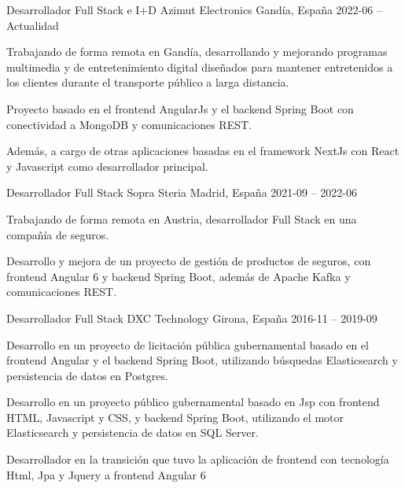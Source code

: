 \documentclass[]{awesome-cv}
\begin{document}
\begin{cventries}
	\cventry
	{Desarrollador Full Stack e I+D}
	{Azimut Electronics}
	{Gandía, España}
	{2022-06 – Actualidad}
	{\begin{cvitems}
		\vspace{0.5mm}
		\item {Trabajando de forma remota en Gandía, desarrollando y mejorando programas multimedia y de entretenimiento digital diseñados para mantener entretenidos a los clientes durante el transporte público a larga distancia.}
		\item {Proyecto basado en el frontend AngularJs y el backend Spring Boot con conectividad a MongoDB y comunicaciones REST.}
        \item {Además, a cargo de otras aplicaciones basadas en el framework NextJs con React y Javascript como desarrollador principal.}
		\end{cvitems}}

	\cventry
	{Desarrollador Full Stack}
	{Sopra Steria}
	{Madrid, España}
	{2021-09 – 2022-06}
	{\begin{cvitems}
		\vspace{0.5mm}
		\item {Trabajando de forma remota en Austria, desarrollador Full Stack en una compañía de seguros.}
		\item {Desarrollo y mejora de un proyecto de gestión de productos de seguros, con frontend Angular 6 y backend Spring Boot, además de Apache Kafka y comunicaciones REST.}
		\end{cvitems}}

	\cventry
	{Desarrollador Full Stack}
	{DXC Technology}
	{Girona, España}
	{2016-11 – 2019-09}
	{\begin{cvitems}
		\vspace{0.5mm}
		\item {Desarrollo en un proyecto de licitación pública gubernamental basado en el frontend Angular y el backend Spring Boot, utilizando búsquedas Elasticsearch y persistencia de datos en Postgres.}
  \item {Desarrollo en un proyecto público gubernamental basado en Jsp con frontend HTML, Javascript y CSS, y backend Spring Boot, utilizando el motor Elasticsearch y persistencia de datos en SQL Server.}
  \item {Desarrollador en la transición que tuvo la aplicación de frontend con tecnología Html, Jpa y Jquery a frontend Angular 6}
		\end{cvitems}}


\end{cventries}
\end{document}
